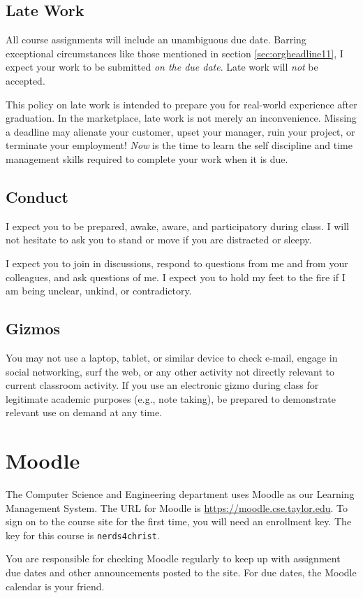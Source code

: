\documentclass{article}
\begin{document}
\subsection{Late Work}
\label{sec:orgheadline12}
All course assignments will include an unambiguous due date.
Barring exceptional circumstances like those mentioned in section \ref{sec:orgheadline11},
I expect your work to be submitted \emph{on the due date}.
Late work will \emph{not} be accepted.

This policy on late work is intended to prepare you
for real-world experience after graduation.
In the marketplace,
late work is not merely an inconvenience.
Missing a deadline may
alienate your customer,
upset your manager,
ruin your project,
or terminate your employment!
\emph{Now} is the time to learn the self discipline and time management skills
required to complete your work when it is due.
\subsection{Conduct}
\label{sec:orgheadline13}
I expect you to be prepared, awake, aware, and participatory during class. I will not
hesitate to ask you to stand or move if you are distracted or sleepy.

I expect you to join in discussions, respond to questions from me and from your
colleagues, and ask questions of me. I expect you to hold my feet to the fire if I am
being unclear, unkind, or contradictory.
\subsection{Gizmos}
\label{sec:orgheadline14}
You may not use a laptop, tablet, or similar device to check e-mail, engage in social
networking, surf the web, or any other activity not directly relevant
to current classroom activity.
If you use an electronic gizmo during class for legitimate academic purposes
(e.g., note taking), be prepared to demonstrate relevant use on demand
at any time.
\section{Moodle}
\label{sec:orgheadline16}
The Computer Science and Engineering department uses Moodle as our Learning Management
System. The URL for Moodle is \url{https://moodle.cse.taylor.edu}. To sign on to the course site
for the first time, you will need an enrollment key. The key for this course is
\texttt{nerds4christ}.

You are responsible for checking Moodle regularly to keep up with assignment due dates and
other announcements posted to the site. For due dates, the Moodle calendar is your friend.
\end{document}
